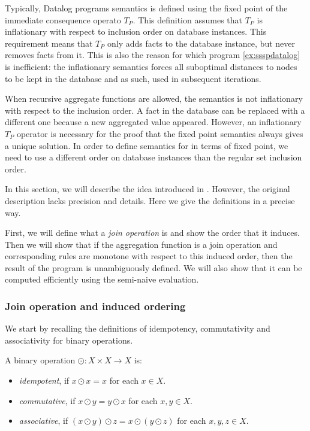 Typically, Datalog programs semantics is defined using the fixed point of the immediate consequence operato $T_P$. This definition assumes that $T_P$ is inflationary with respect to inclusion order on database instances. This requirement means that $T_P$ only adds facts to the database instance, but never removes facts from it. This is also the reason for which program \ref{ex:ssspdatalog} is inefficient: the inflationary semantics forces all suboptimal distances to nodes to be kept in the database and as such, used in subsequent iterations.

When recursive aggregate functions are allowed, the semantics is not inflationary with respect to the inclusion order. A fact in the database can be replaced with a different one because a new aggregated value appeared. However, an inflationary $T_P$ operator is necessary for the proof that the fixed point semantics always gives a unique solution. In order to define semantics for \datalogra in terms of fixed point, we need to use a different order on database instances than the regular set inclusion order.

In this section, we will describe the idea introduced in \cite{socialite}. However, the original description lacks precision and details. Here we give the definitions in a precise way.

First, we will define what a \emph{join operation} is and show the order that it induces. Then we will show that if the aggregation function is a join operation and corresponding rules are monotone with respect to this induced order, then the result of the program is unambiguously defined. We will also show that it can be computed efficiently using the semi-naive evaluation.

\subsubsection{Join operation and induced ordering}
We start by recalling the definitions of idempotency, commutativity and associativity for binary operations.
\begin{defn}
A binary operation $\odot: X \times X \to X$ is:
\begin{itemize}
\item \emph{idempotent}, if $x \odot x = x$ for each $x \in X$.
\item \emph{commutative}, if $x \odot y = y \odot x$ for each $x, y \in X$.
\item \emph{associative}, if $(x \odot y) \odot z = x \odot (y \odot z)$ for each $x, y, z \in X$.
\end{itemize}
\end{defn}

